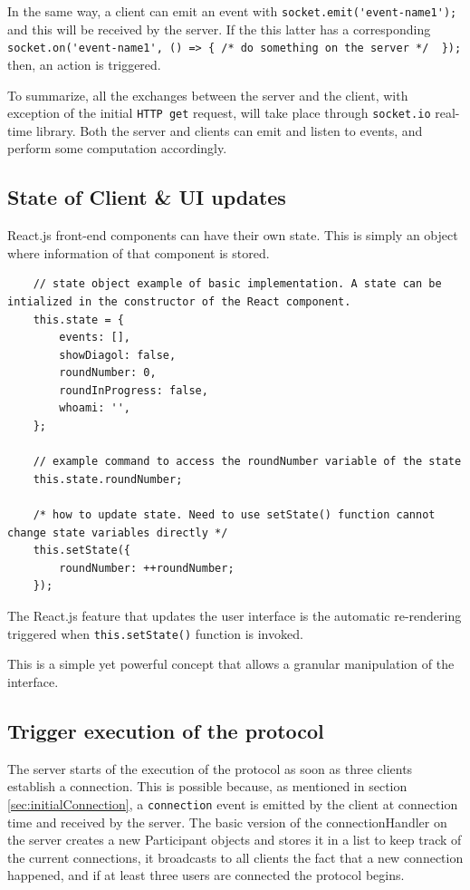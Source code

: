 In the same way, a client can emit an event with \lstinline{socket.emit('event-name1');} and this will be received by the server. If the this latter has a corresponding \lstinline|socket.on('event-name1', () => { /* do something on the server */  });| then, an action is triggered. \newline


To summarize, all the exchanges between the server and the client, with exception of the initial \lstinline{HTTP get} request, will take place through \lstinline{socket.io} real-time library. Both the server and clients can emit and listen to events, and perform some computation accordingly. 


\subsection{State of Client \& UI updates}
React.js front-end components can have their own state. This is simply an object where information of that component is stored.
\begin{lstlisting}
    // state object example of basic implementation. A state can be intialized in the constructor of the React component.
    this.state = {
        events: [],
        showDiagol: false,
        roundNumber: 0,
        roundInProgress: false,
        whoami: '',
    };
    
    // example command to access the roundNumber variable of the state
    this.state.roundNumber;
    
    /* how to update state. Need to use setState() function cannot change state variables directly */
    this.setState({
        roundNumber: ++roundNumber;
    });
\end{lstlisting}

The React.js feature that updates the user interface is the automatic re-rendering triggered when \lstinline{this.setState()} function is invoked.

This is a simple yet powerful concept that allows a granular manipulation of the interface.


\subsection{Trigger execution of the protocol} \label{sec:triggerProtocol}
The server starts of the execution of the protocol as soon as three clients establish a connection. This is possible because, as mentioned in section \ref{sec:initialConnection}, a \lstinline{connection} event is emitted by the client at connection time and received by the server. The basic version of the connectionHandler on the server creates a new Participant objects and stores it in a list to keep track of the current connections, it broadcasts to all clients the fact that a new connection happened, and if at least three users are connected the protocol begins.

